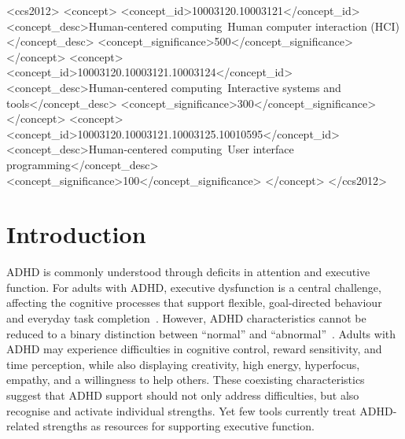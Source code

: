 \documentclass[manuscript,screen,review,anonymous]{acmart}
\begin{document}

\begin{CCSXML}
<ccs2012>
 <concept>
  <concept_id>10003120.10003121</concept_id>
  <concept_desc>Human-centered computing~Human computer interaction (HCI)</concept_desc>
  <concept_significance>500</concept_significance>
 </concept>
 <concept>
  <concept_id>10003120.10003121.10003124</concept_id>
  <concept_desc>Human-centered computing~Interactive systems and tools</concept_desc>
  <concept_significance>300</concept_significance>
 </concept>
 <concept>
  <concept_id>10003120.10003121.10003125.10010595</concept_id>
  <concept_desc>Human-centered computing~User interface programming</concept_desc>
  <concept_significance>100</concept_significance>
 </concept>
</ccs2012>
\end{CCSXML}



\maketitle

\section{Introduction}
ADHD is commonly understood through deficits in attention and executive function. For adults with ADHD, executive dysfunction is a central challenge\cite{nigg2005}, affecting the cognitive processes that support flexible, goal-directed behaviour and everyday task completion~\cite{miyake2000}. However, ADHD characteristics cannot be reduced to a binary distinction between ``normal'' and ``abnormal''~\cite{sedgwick2019}. Adults with ADHD may experience difficulties in cognitive control, reward sensitivity, and time perception, while also
displaying creativity, high energy, hyperfocus, empathy, and a willingness to help others. These coexisting characteristics suggest that ADHD support should not only address difficulties, but also recognise and activate individual strengths\cite{sedgwick2019}. Yet few tools currently treat ADHD-related strengths as resources for supporting executive function.
\end{document}
